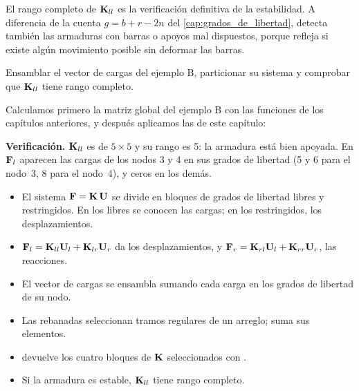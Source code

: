 \begin{recuerda}
El rango completo de $\mathbf{K}_{ll}$ es la verificación definitiva de la
estabilidad. A diferencia de la cuenta $g = b + r - 2n$ del
\cref{cap:grados_de_libertad}, detecta también las armaduras con barras o
apoyos mal dispuestos, porque refleja si existe algún movimiento posible sin
deformar las barras.
\end{recuerda}

\begin{problemaresuelto}[El ejemplo B]
Ensamblar el vector de cargas del ejemplo B, particionar su sistema y
comprobar que $\mathbf{K}_{ll}$ tiene rango completo.

\solucion
Calculamos primero la matriz global del ejemplo B con las funciones de los
capítulos anteriores, y después aplicamos las de este capítulo:

\textbf{Verificación.} $\mathbf{K}_{ll}$ es de $5\times5$ y su rango es 5: la
armadura está bien apoyada. En $\mathbf{F}_l$ aparecen las cargas de los nodos 3 y 4
en sus grados de libertad (5 y 6 para el nodo~3, 8 para el nodo~4), y ceros en
los demás.
\end{problemaresuelto}

\repasoyresumen

\begin{itemize}
  \item El sistema $\mathbf{F} = \mathbf{K}\,\mathbf{U}$ se divide en bloques de grados de
    libertad libres y restringidos. En los libres se conocen las cargas; en
    los restringidos, los desplazamientos.
  \item $\mathbf{F}_l = \mathbf{K}_{ll}\mathbf{U}_l + \mathbf{K}_{lr}\mathbf{U}_r$ da los desplazamientos, y
    $\mathbf{F}_r = \mathbf{K}_{rl}\mathbf{U}_l + \mathbf{K}_{rr}\mathbf{U}_r$, las reacciones.
  \item El vector de cargas se ensambla sumando cada carga en los grados de
    libertad de su nodo.
  \item Las rebanadas  seleccionan tramos regulares de
    un arreglo;  suma sus elementos.
  \item {} devuelve los cuatro bloques de $\mathbf{K}$ seleccionados
    con .
  \item Si la armadura es estable, $\mathbf{K}_{ll}$ tiene rango completo.
\end{itemize}

\ejercicios

